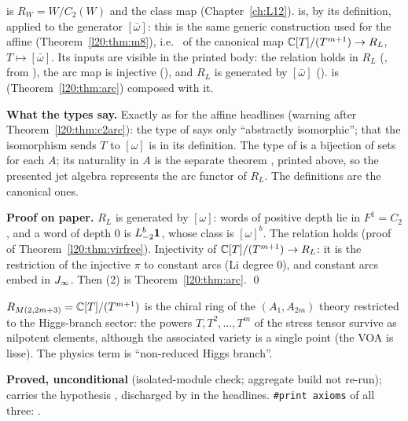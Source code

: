 \begin{dictionary}
 is $R_W=W/C_2(W)$ and  the class map (Chapter~\ref{ch:L12}).  is, by its
definition,  applied to the generator $[\bar\omega]$: this is the same generic
construction used for the affine  (Theorem~\ref{l20:thm:m8}), i.e.\  of the
canonical map ${\mathbb{C}}[T]/(T^{m+1})\to R_L$, $T\mapsto[\bar\omega]$. Its inputs are visible in the printed body: the relation
holds in $R_L$ (, from ), the arc map is injective
(), and $R_L$ is generated by $[\bar\omega]$ ().
 is  (Theorem~\ref{l20:thm:arc}) composed with it.

\textbf{What the types say.} Exactly as for the affine headlines (warning after Theorem~\ref{l20:thm:c2arc}): the type of
 says only ``abstractly isomorphic''; that the isomorphism sends $T$ to $[\omega]$ is in its definition. The type
of  is a bijection of sets for each $A$; its naturality in $A$ is the separate theorem
, printed above, so the presented jet algebra represents the arc
functor of $R_L$. The definitions are the canonical ones.
\end{dictionary}

\textbf{Proof on paper.} $R_L$ is generated by $[\omega]$: words of positive depth lie in $F^1=C_2$, and a word of depth $0$ is
$L_{-2}^b\mathbf{1}$, whose class is $[\omega]^b$. The relation holds (proof of Theorem~\ref{l20:thm:virfree}). Injectivity of
${\mathbb{C}}[T]/(T^{m+1})\to R_L$: it is the restriction of the injective $\pi$ to constant arcs (Li degree $0$), and constant arcs embed
in $J_\infty$. Then (2) is Theorem~\ref{l20:thm:arc}. \qed

\begin{physics}
$R_{M(2,2m+3)}={\mathbb{C}}[T]/(T^{m+1})$ is the chiral ring of the $(A_1,A_{2m})$ theory restricted to the Higgs-branch sector: the
powers $T,T^2,\dots,T^m$ of the stress tensor survive as nilpotent elements, although the associated variety is a single point
(the VOA is lisse). The physics term is ``non-reduced Higgs branch''.
\end{physics}

\begin{status}
\textbf{Proved, unconditional} (isolated-module check; aggregate build not re-run);  carries the hypothesis , discharged by
 in the headlines. \texttt{\#print axioms} of all three:
.
\end{status}

